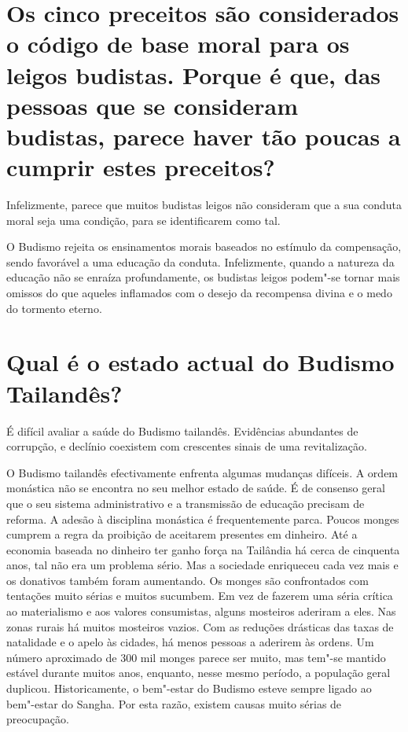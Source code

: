 \section{Os cinco preceitos são considerados o código de base moral para os
  leigos budistas. Porque é que, das pessoas que se consideram budistas, parece
  haver tão poucas a cumprir estes preceitos?}

Infelizmente, parece que muitos budistas leigos não consideram que a sua
conduta moral seja uma condição, para se identificarem como tal.

O Budismo rejeita os ensinamentos morais baseados no estímulo da
compensação, sendo favorável a uma educação da conduta. Infelizmente,
quando a natureza da educação não se enraíza profundamente, os budistas
leigos podem"-se tornar mais omissos do que aqueles inflamados com o
desejo da recompensa divina e o medo do tormento eterno.

\section{Qual é o estado actual do Budismo Tailandês?}

É difícil avaliar a saúde do Budismo tailandês. Evidências abundantes de
corrupção, e declínio coexistem com crescentes sinais de uma
revitalização.

O Budismo tailandês efectivamente enfrenta algumas mudanças difíceis. A
ordem monástica não se encontra no seu melhor estado de saúde. É de
consenso geral que o seu sistema administrativo e a transmissão de
educação precisam de reforma. A adesão à disciplina monástica é
frequentemente parca. Poucos monges cumprem a regra da proibição de
aceitarem presentes em dinheiro. Até a economia baseada no dinheiro ter
ganho força na Tailândia há cerca de cinquenta anos, tal não era um
problema sério. Mas a sociedade enriqueceu cada vez mais e os donativos
também foram aumentando. Os monges são confrontados com tentações muito
sérias e muitos sucumbem. Em vez de fazerem uma séria crítica ao
materialismo e aos valores consumistas, alguns mosteiros aderiram a
eles. Nas zonas rurais há muitos mosteiros vazios. Com as reduções
drásticas das taxas de natalidade e o apelo às cidades, há menos pessoas
a aderirem às ordens. Um número aproximado de 300 mil monges parece ser
muito, mas tem"-se mantido estável durante muitos anos, enquanto, nesse
mesmo período, a população geral duplicou. Historicamente, o bem"-estar
do Budismo esteve sempre ligado ao bem"-estar do Sangha. Por esta razão,
existem causas muito sérias de preocupação.

